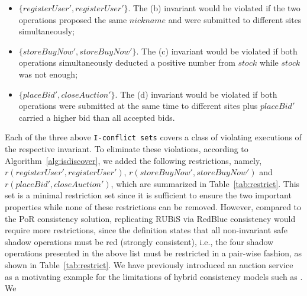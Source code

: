 \begin{itemize}
 \item$\{registerUser', registerUser'\}$. The (b) invariant would
be violated if the two operations proposed the same $nickname$ and were submitted to different sites simultaneously;
 \item $\{storeBuyNow', storeBuyNow'\}$. The (c) invariant would be violated if both operations simultaneously
deducted a positive number from $stock$ while $stock$ was not enough; 
 \item $\{placeBid', closeAuction'\}$. The (d) invariant would be violated if both operations were submitted at the same
time to different sites plus $placeBid'$ carried a higher bid than all accepted bids.
\end{itemize} 
Each of the three above {\tt I-conflict sets} covers a class
of violating executions of the respective invariant. To eliminate these
violations, according to Algorithm~\ref{alg:isdiscover}, we added the following restrictions, namely,
$r(registerUser', registerUser')$, $r(storeBuyNow', storeBuyNow')$ and $r(placeBid', closeAuction')$, 
which are summarized in Table~\ref{tab:restrict}. This set is a minimal restriction
set since it is sufficient to ensure the two important properties while none of these restrictions
can be removed. However, compared to the PoR consistency solution, replicating RUBiS
via RedBlue consistency would require more restrictions, since the definition states that
all non-invariant safe shadow operations must be red (strongly consistent), i.e., the four shadow operations presented
in the above list must be restricted in a pair-wise fashion, as shown in Table~\ref{tab:restrict}. 
We have previously introduced an auction service
as a motivating example for the limitations of hybrid consistency models such as
\RBCN. We 
